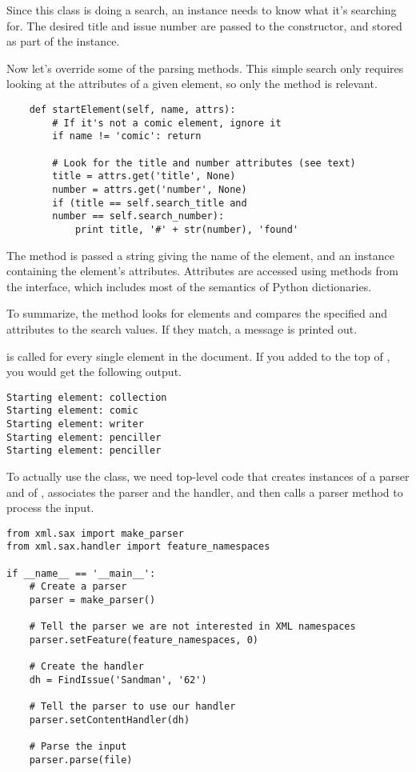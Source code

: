\documentclass{howto}
\newcommand{\element}[1]{\code{#1}}
\newcommand{\attribute}[1]{\code{#1}}
\begin{document}
Since this class is doing a search, an instance needs to know what
it's searching for.  The desired title and issue number are passed to
the  constructor, and stored as part of the instance.

Now let's override some of the parsing methods.
This simple search only requires looking at the attributes of a given
element, so only the  method is relevant.

\begin{verbatim}
    def startElement(self, name, attrs):
        # If it's not a comic element, ignore it
        if name != 'comic': return

        # Look for the title and number attributes (see text)
        title = attrs.get('title', None)
        number = attrs.get('number', None)
        if (title == self.search_title and 
	    number == self.search_number):
            print title, '#' + str(number), 'found'
\end{verbatim}

The  method is passed a string giving the name
of the element, and an instance containing the element's attributes.
Attributes are accessed using 
methods from the  interface, which
includes most of the semantics of Python dictionaries.  

To summarize, the  method looks for
\element{comic} elements and compares the specified \attribute{title}
and \attribute{number} attributes to the search values.  If they
match, a message is printed out.

 is called for every single element in the
document.  If you added  to the
top of  , you would get the following output.

\begin{verbatim}
Starting element: collection
Starting element: comic
Starting element: writer
Starting element: penciller
Starting element: penciller
\end{verbatim}

To actually use the class, we need top-level code that creates
instances of a parser and of , associates the parser
and the handler, and then calls a parser method to process the input.

\begin{verbatim}
from xml.sax import make_parser
from xml.sax.handler import feature_namespaces

if __name__ == '__main__':
    # Create a parser
    parser = make_parser()

    # Tell the parser we are not interested in XML namespaces
    parser.setFeature(feature_namespaces, 0)

    # Create the handler
    dh = FindIssue('Sandman', '62')

    # Tell the parser to use our handler
    parser.setContentHandler(dh)

    # Parse the input
    parser.parse(file)
\end{verbatim}
\end{document}
